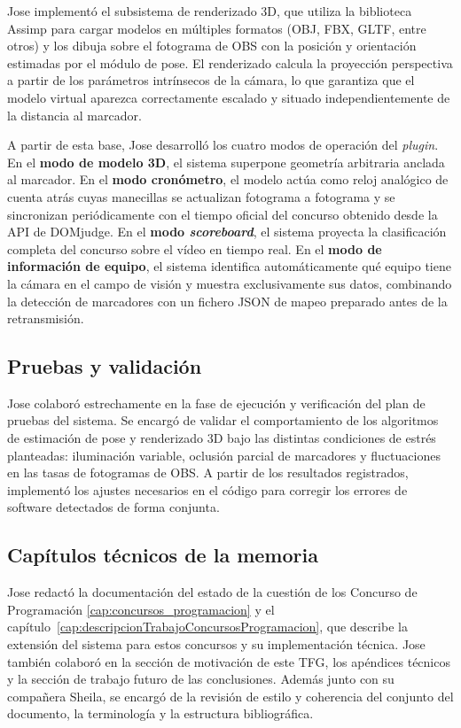Jose implementó el subsistema de renderizado 3D, que utiliza la biblioteca Assimp para cargar modelos en múltiples formatos (OBJ, FBX, GLTF, entre otros) y los dibuja sobre el fotograma de OBS con la posición y orientación estimadas por el módulo de pose. El renderizado calcula la proyección perspectiva a partir de los parámetros intrínsecos de la cámara, lo que garantiza que el modelo virtual aparezca correctamente escalado y situado independientemente de la distancia al marcador.

A partir de esta base, Jose desarrolló los cuatro modos de operación del \textit{plugin}. En el \textbf{modo de modelo 3D}, el sistema superpone geometría arbitraria anclada al marcador. En el \textbf{modo cronómetro}, el modelo actúa como reloj analógico de cuenta atrás cuyas manecillas se actualizan fotograma a fotograma y se sincronizan periódicamente con el tiempo oficial del concurso obtenido desde la API de DOMjudge. En el \textbf{modo \textit{scoreboard}}, el sistema proyecta la clasificación completa del concurso sobre el vídeo en tiempo real. En el \textbf{modo de información de equipo}, el sistema identifica automáticamente qué equipo tiene la cámara en el campo de visión y muestra exclusivamente sus datos, combinando la detección de marcadores con un fichero JSON de mapeo preparado antes de la retransmisión.

\subsection*{Pruebas y validación}

Jose colaboró estrechamente en la fase de ejecución y verificación del plan de pruebas del sistema. Se encargó de validar el comportamiento de los algoritmos de estimación de pose y renderizado 3D bajo las distintas condiciones de estrés planteadas: iluminación variable, oclusión parcial de marcadores y fluctuaciones en las tasas de fotogramas de OBS. A partir de los resultados registrados, implementó los ajustes necesarios en el código para corregir los errores de software detectados de forma conjunta.

\subsection*{Capítulos técnicos de la memoria}
Jose redactó la documentación del estado de la cuestión de los Concurso de Programación \ref{cap:concursos_programacion} y el capítulo~\ref{cap:descripcionTrabajoConcursosProgramacion}, que describe la extensión del sistema para estos concursos y su implementación técnica. Jose también colaboró en la sección de motivación de este TFG, los apéndices técnicos y la sección de trabajo futuro de las conclusiones. Además junto con su compañera Sheila, se encargó de la revisión de estilo y coherencia del conjunto del documento, la terminología y la estructura bibliográfica.


